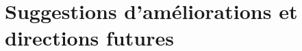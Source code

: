 \chapter{Suggestions d'améliorations et directions futures}
    \section{}
        \subsection{}
            \subsubsection{}